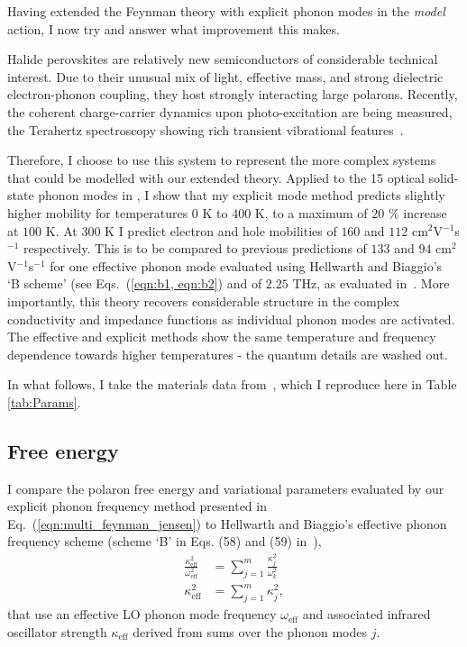 Having extended the Feynman theory with explicit phonon modes in the \emph{model} action, I now try and answer what improvement this makes. 

Halide perovskites are relatively new semiconductors of considerable technical interest. Due to their unusual mix of light, effective mass, and strong dielectric electron-phonon coupling, they host strongly interacting large polarons.
Recently, the coherent charge-carrier dynamics upon photo-excitation are being measured, the Terahertz spectroscopy showing rich transient vibrational features~\cite{guzelturk_terahertz_2018}.

Therefore, I choose to use this system to represent the more complex systems that could be modelled with our extended theory. Applied to the 15 optical solid-state phonon modes in , I show that my explicit mode method predicts slightly higher mobility for temperatures $0$ K to $400$ K, to a maximum of $20$ \% increase at $100$ K. At $300$ K I predict electron and hole mobilities of $160$ and $112$ cm$^2$V$^{-1}$s$^{-1}$ respectively. This is to be compared to previous predictions of $133$ and $94$ cm$^2$V$^{-1}$s$^{-1}$ for one effective phonon mode evaluated using Hellwarth and Biaggio's~\cite{hellwarth_mobility_1999} `B scheme' (see Eqs.~(\ref{eqn:b1, eqn:b2}) and of $2.25$ THz, as evaluated in~\cite{frost_calculating_2017}. More importantly, this theory recovers considerable structure in the complex conductivity and impedance functions as individual phonon modes are activated. The effective and explicit methods show the same temperature and frequency dependence towards higher temperatures - the quantum details are washed out. 

In what follows, I take the materials data from~\cite{frost_calculating_2017}, which I reproduce here in Table \ref{tab:Params}.

\subsection{Free energy} \label{Sec:compfreeenergy}

I compare the polaron free energy and variational parameters evaluated by our explicit phonon frequency method presented in Eq.~(\ref{eqn:multi_feynman_jensen}) to Hellwarth and Biaggio's effective phonon frequency scheme (scheme `B' in Eqs. (58) and (59) in~\cite{hellwarth_mobility_1999}),
\begin{subequations}
    \begin{align}
        \frac{\kappa_{\text{eff}}^2}{\omega_{\text{eff}}^2} &= \sum_{j=1}^m \frac{\kappa_j^2}{\omega_k^2} \label{eqn:b1}\\
        \kappa_{\text{eff}}^2 &= \sum_{j=1}^m \kappa_j^2, \label{eqn:b2}
    \end{align}
\end{subequations}
that use an effective LO phonon mode frequency $\omega_{\text{eff}}$ and associated  infrared oscillator strength $\kappa_{\text{eff}}$ derived from sums over the phonon modes $j$. 

